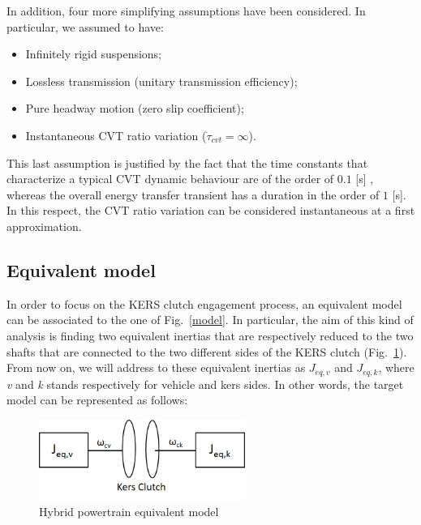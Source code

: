 \documentclass[11pt]{article}
\begin{document}
In addition, four more simplifying assumptions have been considered. In particular, we assumed to have: 

\begin{itemize}
	\item Infinitely rigid suspensions;
	\item Lossless transmission (unitary transmission efficiency);
	\item Pure headway motion (zero slip coefficient);
	\item Instantaneous CVT ratio variation ($\dot{\tau}_{cvt}=\infty$).
\end{itemize}

This last assumption is justified by the fact that the time constants that characterize a typical CVT dynamic behaviour are of the order of $0.1$ [s] \cite{o}, whereas the overall energy transfer transient has a duration in the order of $1$ [s]. In this respect, the CVT ratio variation can be considered instantaneous at a first approximation.  
 
\newpage
 
\subsection{Equivalent model}

In order to focus on the KERS clutch engagement process, an equivalent model can be associated to the one of Fig.~\ref{model}. In particular, the aim of this kind of analysis is finding two equivalent inertias that are respectively reduced to the two shafts that are connected to the two different sides of the KERS clutch (Fig.~\ref{eq_model}).
From now on, we will address to these equivalent inertias as $J_{eq,v}$ and $J_{eq,k}$, where \textit{v} and \textit{k} stands respectively for vehicle and kers sides.
In other words, the target model can be represented as follows:

\begin{figure}[H]
\centering
\includegraphics[width=0.6\textwidth]{Images/Model/Equivalent_model.jpg}
\caption{Hybrid powertrain equivalent model}
\label{eq_model}
\end{figure}
\end{document}
